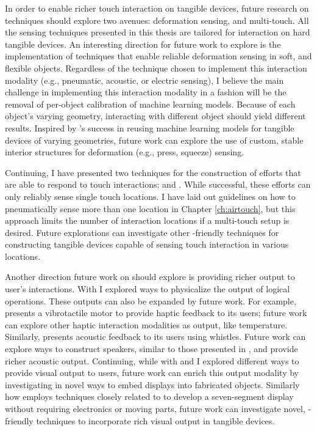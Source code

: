       In order to enable richer touch interaction on tangible devices, future
      research on \papf techniques should explore two avenues: deformation sensing,
      and multi-touch. All the sensing techniques presented in this thesis are
      tailored for interaction on hard tangible devices. An interesting
      direction for future work to explore is the implementation of \pap
      techniques that enable reliable deformation sensing in soft, and flexible
      objects.  Regardless of the technique chosen to implement this interaction
      modality (e.g., pneumatic, acoustic, or electric sensing), I believe the
      main challenge in implementing this interaction modality in a \pap fashion
      will be the removal of per-object calibration of machine learning models.
      Because of each object's varying geometry, interacting with different
      object should yield different results. Inspired by \at's success in
      reusing machine learning models for tangible devices of varying
      geometries, future work can explore the use of custom, stable interior
      structures for deformation (e.g., press, squeeze) sensing.

      Continuing, I have presented two techniques for the construction of
      efforts that are able to respond to touch interactions: \at and \al. While
      successful, these efforts can only reliably sense single touch locations.
      I have laid out guidelines on how to pneumatically sense more than one
      location in Chapter \ref{ch:airtouch}, but this approach limits the number
      of interaction locations if a multi-touch setup is desired. Future
      explorations can investigate other \pap-friendly techniques for
      constructing tangible devices capable of sensing touch interaction in
      various locations.

      Another direction future work on \papf should explore is providing richer
      output to user's interactions. With \al I explored ways to physicalize the
      output of logical operations. These outputs can also be expanded by future
      work. For example, \al presents a vibrotactile motor to provide haptic
      feedback to its users; future work can explore other haptic interaction
      modalities as output, like temperature. Similarly, \al presents acoustic
      feedback to its users using whistles. Future work can explore \pap ways to
      construct speakers, similar to those presented in \cite{Ishiguro:2014},
      and provide richer acoustic output. Continuing, while with \al and \mp I
      explored different ways to provide visual output to users, future work can
      enrich this output modality by investigating in novel ways to embed
      displays into fabricated objects. Similarly how \cite{VanDerHeyden:1969}
      employs techniques closely related to \al to develop a seven-segment
      display without requiring electronics or moving parts, future work can
      investigate novel, \pap-friendly techniques to incorporate rich visual
      output in tangible devices.
      
